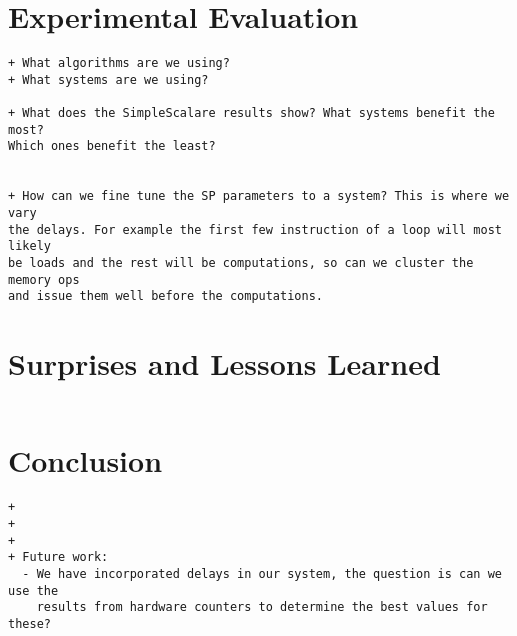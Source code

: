 \documentclass[12pt]{article}
\begin{document}
\section{Experimental Evaluation}
\begin{verbatim}
+ What algorithms are we using?
+ What systems are we using?

+ What does the SimpleScalare results show? What systems benefit the most?
Which ones benefit the least?


+ How can we fine tune the SP parameters to a system? This is where we vary
the delays. For example the first few instruction of a loop will most likely
be loads and the rest will be computations, so can we cluster the memory ops
and issue them well before the computations.

\end{verbatim}


\section{Surprises and Lessons Learned}
\begin{verbatim}
\end{verbatim}

\section{Conclusion}
\begin{verbatim}
+
+
+
+ Future work:
  - We have incorporated delays in our system, the question is can we use the
    results from hardware counters to determine the best values for these?
\end{verbatim}




\end{document}
